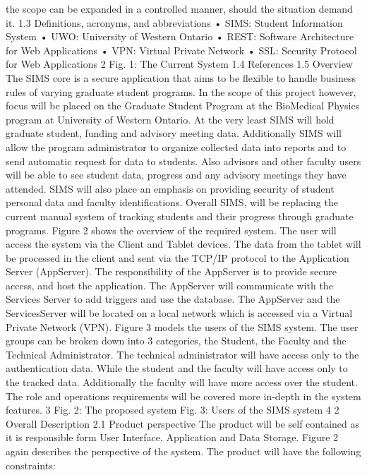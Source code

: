 \documentclass{journal}
\begin{document}
the scope can be expanded in a controlled manner, should the situation demand it.
1.3
Definitions, acronyms, and abbreviations
• SIMS: Student Information System
• UWO: University of Western Ontario
• REST: Software Architecture for Web Applications
• VPN: Virtual Private Network
• SSL: Security Protocol for Web Applications
2
Fig. 1: The Current System
1.4 References
1.5 Overview
The SIMS core is a secure application that aims to be flexible to handle business rules of varying graduate
student programs. In the scope of this project however, focus will be placed on the Graduate Student
Program at the BioMedical Physics program at University of Western Ontario. At the very least SIMS
will hold graduate student, funding and advisory meeting data. Additionally SIMS will allow the program
administrator to organize collected data into reports and to send automatic request for data to students.
Also advisors and other faculty users will be able to see student data, progress and any advisory meetings
they have attended. SIMS will also place an emphasis on providing security of student personal data and
faculty identifications. Overall SIMS, will be replacing the current manual system of tracking students and
their progress through graduate programs.
Figure 2 shows the overview of the required system. The user will access the system via the Client and
Tablet devices. The data from the tablet will be processed in the client and sent via the TCP/IP protocol
to the Application Server (AppServer). The responsibility of the AppServer is to provide secure access, and
host the application. The AppServer will communicate with the Services Server to add triggers and use the
database. The AppServer and the ServicesServer will be located on a local network which is accessed via
a Virtual Private Network (VPN). Figure 3 models the users of the SIMS system. The user groups can be
broken down into 3 categories, the Student, the Faculty and the Technical Administrator. The technical
administrator will have access only to the authentication data. While the student and the faculty will have
access only to the tracked data. Additionally the faculty will have more access over the student. The role
and operations requirements will be covered more in-depth in the system features.
3
Fig. 2: The proposed system
Fig. 3: Users of the SIMS system
4
2
Overall Description
2.1
Product perspective
The product will be self contained as it is responsible form User Interface, Application and Data Storage.
Figure 2 again describes the perspective of the system.
The product will have the following constraints:
\end{document}
